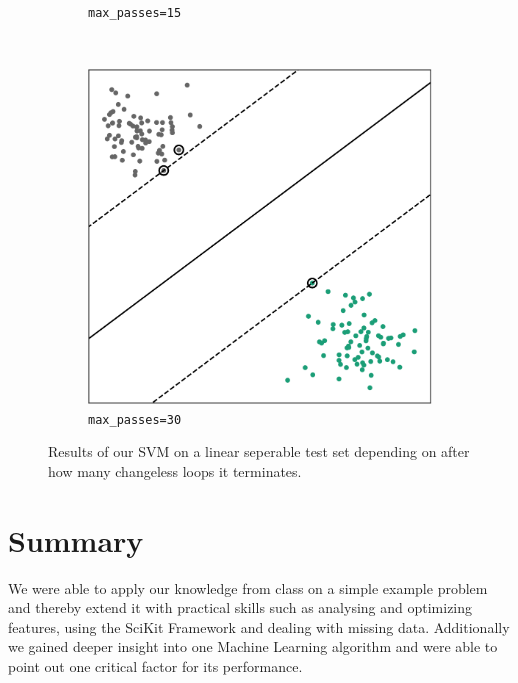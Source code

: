 \begin{figure}
\begin{subfigure}[b]{0.28\textwidth}
        \caption{\texttt{max\_passes=15}}
        \label{fig:max_pass_15}
    \end{subfigure}
    \quad
    ~ %
    \begin{subfigure}[b]{0.28\textwidth}
        \includegraphics[width=\textwidth]{media_saved/own_test_mpasses_30.pdf}
        \caption{\texttt{max\_passes=30}}
        \label{fig:max_pass_30}
    \end{subfigure}
    \caption{Results of our SVM on a linear seperable test set depending on after how many changeless loops it terminates.}\label{fig:max_passes}
\end{figure}

\section{Summary}
We were able to apply our knowledge from class on a simple example problem and thereby extend it with practical skills such as analysing and optimizing features, using the SciKit Framework and dealing with missing data. Additionally we gained deeper insight into one Machine Learning algorithm and were able to point out one critical factor for its performance.

\clearpage
\appendix
